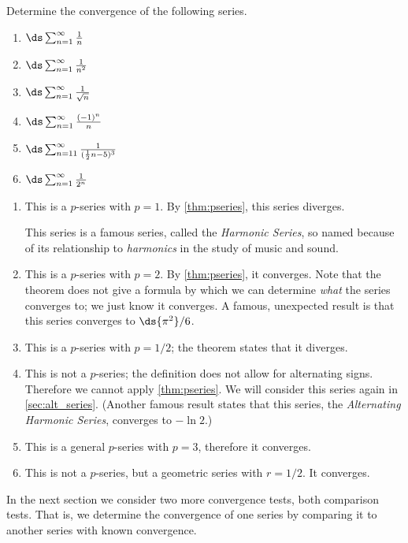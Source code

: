 \begin{example}\label{ex_series6}
Determine the convergence of the following series.
\begin{multicols}{3}
\begin{enumerate}
\item		$\ds\sum_{n=1}^\infty \frac{1}{n}$
\item		$\ds\sum_{n=1}^\infty \frac{1}{n^2}$
\item		$\ds\sum_{n=1}^\infty \frac{1}{\sqrt{n}}$
\item		$\ds\sum_{n=1}^\infty \frac{(-1)^n}{n}$
\item		$\ds\sum_{n=11}^\infty \frac{1}{(\frac12n-5)^3}$
\item		$\ds\sum_{n=1}^\infty \frac{1}{2^n}$
\end{enumerate}
\end{multicols}
\solution
\begin{enumerate}
\item	This is a $p$-series with $p=1$. By \autoref{thm:pseries}, this series diverges.

This series is a famous series, called the \emph{Harmonic Series}, so named because of its relationship to \emph{harmonics} in the study of music and sound. 

\item	This is a $p$-series with $p=2$. By \autoref{thm:pseries}, it converges. Note that the theorem does not give a formula by which we can determine \emph{what} the series converges to; we just know it converges. A famous, unexpected result is that this series converges to $\ds{\pi^2}/{6}$.

\item	This is a $p$-series with $p=1/2$; the theorem states that it diverges.

\item	This is not a $p$-series; the definition does not allow for alternating signs. Therefore we cannot apply \autoref{thm:pseries}. We will consider this series again in \autoref{sec:alt_series}.
(Another famous result states that this series, the \emph{Alternating Harmonic Series}, converges to $-\ln 2$.)

\item	This is a general $p$-series with $p=3$, therefore it converges.

\item	This is not a $p$-series, but a geometric series with $r=1/2$. It converges.
\end{enumerate}
\end{example}

In the next section we consider two more convergence tests, both comparison tests. That is, we determine the convergence of one series by  comparing it to another series with known convergence. 

